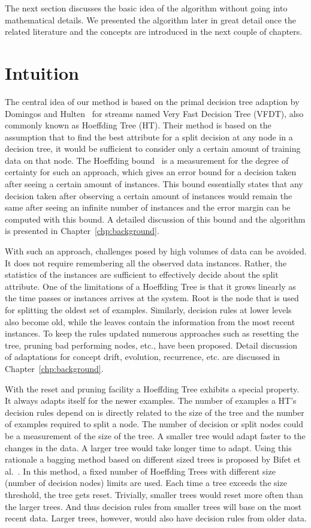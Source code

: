 The next section discusses the basic idea of the algorithm without going into mathematical details. We presented the algorithm later in great detail once the related literature and the concepts are introduced in the next couple of chapters.

\section{Intuition}
The central idea of our method is based on the primal decision tree adaption by Domingos and Hulten~\cite{domingos00:vfdt} for streams named Very Fast Decision Tree (VFDT), also commonly known as Hoeffding Tree (HT). Their method is based on the assumption that to find the best attribute for a split decision at any node in a decision tree, it would be sufficient to consider only a certain amount of training data on that node. The Hoeffding bound~\cite{hoeffding63:bound} is a measurement for the degree of certainty for such an approach, which gives an error bound for a decision taken after seeing a certain amount of instances. This bound essentially states that any decision taken after observing a certain amount of instances would remain the same after seeing an infinite number of instances and the error margin can be computed with this bound. A detailed discussion of this bound and the algorithm is presented in Chapter~\ref{chp:background}.

With such an approach, challenges posed by high volumes of data can be avoided. It does not require remembering all the observed data instances. Rather, the statistics of the instances are sufficient to effectively decide about the split attribute. One of the limitations of a Hoeffding Tree is that it grows linearly as the time passes or instances arrives at the system. Root is the node that is used for splitting the oldest set of examples. Similarly, decision rules at lower levels also become old, while the leaves contain the information from the most recent instances. To keep the rules updated numerous approaches such as resetting the tree, pruning bad performing nodes, etc., have been proposed. Detail discussion of adaptations for concept drift, evolution, recurrence, etc. are discussed in Chapter~\ref{chp:background}.

With the reset and pruning facility a Hoeffding Tree exhibits a special property. It always adapts itself for the newer examples. The number of examples a HT's decision rules depend on is directly related to the size of the tree and the number of examples required to split a node. The number of decision or split nodes could be a measurement of the size of the tree. A smaller tree would adapt faster to the changes in the data. A larger tree would take longer time to adapt. Using this rationale a bagging method based on different sized trees is proposed by Bifet et al.~\cite{bifet09:asht}. In this method, a fixed number of Hoeffding Trees with different size (number of decision nodes) limits are used. Each time a tree exceeds the size threshold, the tree gets reset. Trivially, smaller trees would reset more often than the larger trees. And thus decision rules from smaller trees will base on the most recent data. Larger trees, however, would also have decision rules from older data.

